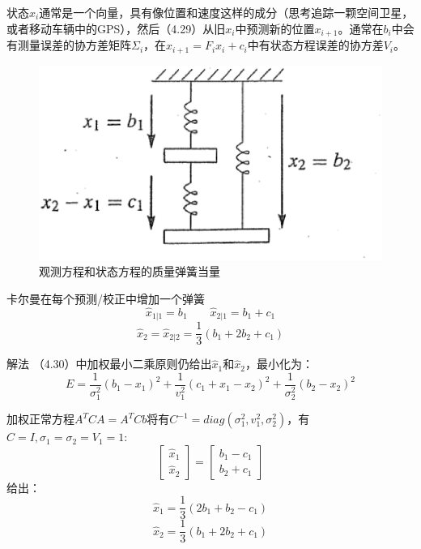 	状态$x_i$通常是一个向量，具有像位置和速度这样的成分（思考追踪一颗空间卫星，或者移动车辆中的GPS），然后（4.29）从旧$x_i$中预测新的位置$x_{i+1}$。通常在$b_i$中会有测量误差的协方差矩阵$\Sigma_i$，在$x_{i+1}=F_ix_i+c_i$中有状态方程误差的协方差$V_i$。		
  
   \begin{figure}
		\centering
		\includegraphics[width=0.7\linewidth]{TeX_files/Part02/chapter04/image/4-4}
		\caption{观测方程和状态方程的质量弹簧当量}
		\label{fig:4-4}
	\end{figure}	
	卡尔曼在每个预测/校正中增加一个弹簧 
	\begin{equation*}
	\hat{x}_{1|1}=b_1  \qquad  \hat{x}_{2|1}=b_1+c_1
	\end{equation*}
	\begin{equation*}
	\hat{x}_2=\hat{x}_{2|2}=\frac{1}{3}(b_1+2b_2+c_1)
	\end{equation*}
	
	解法 \quad  （4.30）中加权最小二乘原则仍给出$\hat{x}_1$和$\hat{x}_2$，最小化为：
	\begin{equation}
	E=\frac{1}{\sigma^2_1}(b_1-x_1)^2+\frac{1}{v^2_1}(c_1+x_1-x_2)^2+\frac{1}{\sigma^2_2}(b_2-x_2)^2
	\end{equation}
	
	加权正常方程$A^TCA=A^TCb$将有$C^{-1}=diag(\sigma^2_1,v^2_1,\sigma^2_2)$，有$C=I,\sigma_1=\sigma_2=V_1=1$:
	\begin{equation}
	\begin{bmatrix}
	\hat{x}_1  \\ \hat{x}_2
	\end{bmatrix}
	=
	\begin{bmatrix}
	b_1-c_1  \\  b_2+c_1
	\end{bmatrix}
	\end{equation}
	给出：
	\begin{equation*}
	\hat{x}_1=\frac{1}{3}(2b_1+b_2-c_1)
	\end{equation*}
	\begin{equation*}
	\hat{x}_2=\frac{1}{3}(b_1+2b_2+c_1)
	\end{equation*}
	
